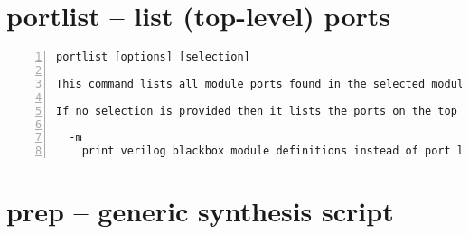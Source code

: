 \section{portlist -- list (top-level) ports}
\label{cmd:portlist}
\begin{lstlisting}[numbers=left,frame=single]
    portlist [options] [selection]

This command lists all module ports found in the selected modules.

If no selection is provided then it lists the ports on the top module.

  -m
    print verilog blackbox module definitions instead of port lists
\end{lstlisting}

\section{prep -- generic synthesis script}
\label{cmd:prep}
